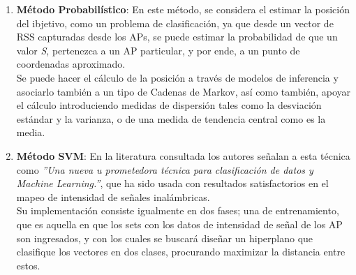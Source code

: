 \begin{itemize}
{\begin{enumerate}
            \begin{enumerate}
                \item {\textbf{Método Probabilístico}: En este método, se considera el estimar la posición del ibjetivo, como un problema de clasificación, ya que desde un vector de RSS capturadas desde los APs, se puede estimar la probabilidad de que un valor \textit{S}, pertenezca a un AP particular, y por ende, a un punto de coordenadas aproximado. \\
                
                Se puede hacer el cálculo de la posición a través de modelos de inferencia y asociarlo también a un tipo de Cadenas de Markov, así como también, apoyar el cálculo introduciendo medidas de dispersión tales como la desviación estándar y la varianza, o de una medida de tendencia central como es la media.\\
                }
                
                \clearpage 
                
                \item{\textbf{Método \ac{SVM}}: \label{SVM} En la literatura consultada \cite{7} los autores señalan a esta técnica como \textit{''Una nueva u prometedora técnica para clasificación de datos y Machine Learning.''}, que ha sido usada con resultados satisfactorios en el mapeo de intensidad de señales inalámbricas.\\
                
                Su implementación consiste igualmente en dos fases; una de entrenamiento, que es aquella en que los sets con los datos de  intensidad de señal de los AP son ingresados, y con los cuales se buscará diseñar un hiperplano que clasifique los vectores en dos clases, procurando maximizar la distancia entre estos.\\
                
}
\end{enumerate}
\end{enumerate}}
\end{itemize}
